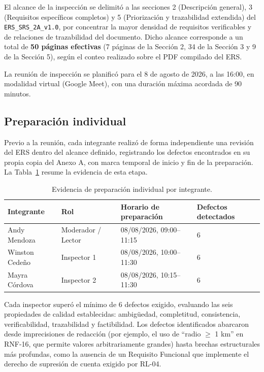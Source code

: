 \documentclass[journal,onecolumn]{IEEEtran}
\begin{document}
	El alcance de la inspección se delimitó a las secciones 2 (Descripción general), 3 (Requisitos específicos completos) y 5 (Priorización y trazabilidad extendida) del \texttt{ERS\_SRS\_2A\_v1.0}, por concentrar la mayor densidad de requisitos verificables y de relaciones de trazabilidad del documento. Dicho alcance corresponde a un total de \textbf{50 páginas efectivas} (7 páginas de la Sección 2, 34 de la Sección 3 y 9 de la Sección 5), según el conteo realizado sobre el PDF compilado del ERS.
	
	La reunión de inspección se planificó para el 8 de agosto de 2026, a las 16:00, en modalidad virtual (Google Meet), con una duración máxima acordada de 90 minutos.
	
	\subsection{Preparación individual}
	
	Previo a la reunión, cada integrante realizó de forma independiente una revisión del ERS dentro del alcance definido, registrando los defectos encontrados en su propia copia del Anexo A, con marca temporal de inicio y fin de la preparación. La Tabla~\ref{tab:preparacion-individual} resume la evidencia de esta etapa.
	
	\begin{table}[H]
		\centering
		\caption{Evidencia de preparación individual por integrante.}
		\label{tab:preparacion-individual}
		\small
		\begin{tabularx}{\textwidth}{@{}l l l X@{}}
			\toprule
			\textbf{Integrante} & \textbf{Rol} & \textbf{Horario de preparación} & \textbf{Defectos detectados} \\
			\midrule
			Andy Mendoza & Moderador / Lector & 08/08/2026, 09:00--11:15 & 6 \\
			Winston Cedeño & Inspector 1 & 08/08/2026, 10:00--11:30 & 6 \\
			Mayra Córdova & Inspector 2 & 08/08/2026, 10:15--11:30 & 6 \\
			\bottomrule
		\end{tabularx}
	\end{table}
	
	Cada inspector superó el mínimo de 6 defectos exigido, evaluando las seis propiedades de calidad establecidas: ambigüedad, completitud, consistencia, verificabilidad, trazabilidad y factibilidad. Los defectos identificados abarcaron desde imprecisiones de redacción (por ejemplo, el uso de ``radio $\geq$ 1 km'' en RNF-16, que permite valores arbitrariamente grandes) hasta brechas estructurales más profundas, como la ausencia de un Requisito Funcional que implemente el derecho de supresión de cuenta exigido por RL-04.
	
\end{document}
